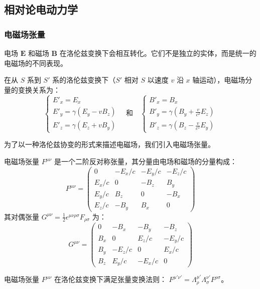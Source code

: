 \documentclass[fontset=none]{ctexart}
\begin{document}
\subsection{相对论电动力学}
\subsubsection{电磁场张量}
电场 $\bm{E}$ 和磁场 $\bm{B}$ 在洛伦兹变换下会相互转化。它们不是独立的实体，而是统一的电磁场的不同表现。
\begin{proposition}[场变换]
在从 $S$ 系到 $S'$ 系的洛伦兹变换下（$S'$ 相对 $S$ 以速度 $v$ 沿 $x$ 轴运动），电磁场分量的变换关系为：
\begin{equation}
\begin{cases} 
E'_x = E_x \\
E'_y = \gamma(E_y - vB_z) \\
E'_z = \gamma(E_z + vB_y)
\end{cases}
\quad \text{和} \quad
\begin{cases} 
B'_x = B_x \\
B'_y = \gamma(B_y + \frac{v}{c^2}E_z) \\
B'_z = \gamma(B_z - \frac{v}{c^2}E_y)
\end{cases}
\end{equation}
\end{proposition}
为了以一种洛伦兹协变的形式来描述电磁场，我们引入电磁场张量。
\begin{definition}[电磁场张量]
电磁场张量 $F^{\mu\nu}$ 是一个二阶反对称张量，其分量由电场和磁场的分量构成：
\begin{equation}
F^{\mu\nu} = 
\begin{pmatrix}
0 & -E_x/c & -E_y/c & -E_z/c \\
E_x/c & 0 & -B_z & B_y \\
E_y/c & B_z & 0 & -B_x \\
E_z/c & -B_y & B_x & 0
\end{pmatrix}
\end{equation}
其对偶张量 $G^{\mu\nu} = \frac{1}{2}\epsilon^{\mu\nu\rho\sigma}F_{\rho\sigma}$ 为：
\begin{equation}
G^{\mu\nu} = 
\begin{pmatrix}
0 & -B_x & -B_y & -B_z \\
B_x & 0 & E_z/c & -E_y/c \\
B_y & -E_z/c & 0 & E_x/c \\
B_z & E_y/c & -E_x/c & 0
\end{pmatrix}
\end{equation}
\end{definition}
电磁场张量 $F^{\mu\nu}$ 在洛伦兹变换下满足张量变换法则： $F^{\mu'\nu'} = \Lambda^{\mu'}_{\rho}\Lambda^{\nu'}_{\sigma}F^{\rho\sigma}$。
\end{document}
